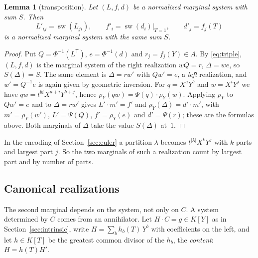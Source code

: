 \documentclass[11pt,a4paper]{article}
\theoremstyle{plain}
\newtheorem{lemma}[theorem]{Lemma}
\theoremstyle{definition}
\theoremstyle{remark}
\begin{document}
\begin{lemma}[transposition]\label{lem:transpose}
Let $(L,f,d)$ be a normalized marginal system with sum $S$. Then
\[
  L'_{ij}=\operatorname{sw}(L_{ji}),\qquad
  f'_i=\operatorname{sw}(d_i)\big|_{T=1},\qquad
  d'_j=f_j(T)
\]
is a normalized marginal system with the same sum $S$.
\end{lemma}
\begin{proof}
Put $Q=\Phi^{-1}(L^{\mathsf T})$, $e=\Phi^{-1}(d)$ and $r_j=f_j(Y)\in A$. By
\eqref{eq:triple}, $(L,f,d)$ is the marginal system of the right realization
$wQ=r$, $\Delta=we$, so $S(\Delta)=S$. The same element is $\Delta=rw'$ with
$Qw'=e$, a \emph{left} realization, and $w'=Q^{-1}e$ is again given by
geometric inversion. For $q=X^aY^b$ and $w=X^iY^j$ we have
$qw=t^{bi}X^{a+i}Y^{b+j}$, hence $\rho_Y(qw)=\Psi(q)\cdot\rho_Y(w)$. Applying
$\rho_Y$ to $Qw'=e$ and to $\Delta=rw'$ gives $L'\cdot m'=f'$ and
$\rho_Y(\Delta)=d'\cdot m'$, with $m'=\rho_Y(w')$, $L'=\Psi(Q)$,
$f'=\rho_Y(e)$ and $d'=\Psi(r)$; these are the formulas above. Both marginals of
$\Delta$ take the value $S(\Delta)$ at~$1$.
\end{proof}

In the encoding of Section~\ref{sec:euler} a partition $\lambda$ becomes
$t^{|\lambda|}X^kY^j$ with $k$ parts and largest part $j$. So the two marginals
of such a realization count by largest part and by number of parts.

\subsection{Canonical realizations}\label{sec:canonical-real}
The second marginal depends on the system, not only on $C$. A system determined
by $C$ comes from an annihilator. Let $H\cdot C=g\in K[Y]$ as in
Section~\ref{sec:intrinsic}, write $H=\sum_bh_b(T)\,Y^b$ with coefficients on the
left, and let $h\in K[T]$ be the greatest common divisor of the $h_b$, the
\emph{content}: $H=h(T)H'$.
\end{document}
